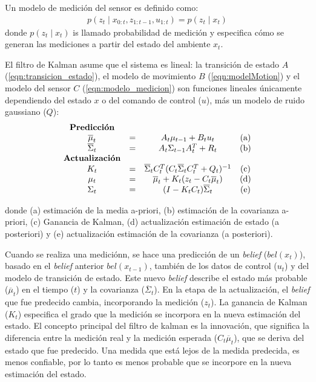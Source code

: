 Un modelo de medici\'on del sensor es definido como:
\begin{align}
\label{eqn:modelo_medicion}
p(z_{t}\mid x_{0:t}, z_{1:t-1}, u_{1:t}) = p (z_{t}\mid x_{t})
\end{align}
donde $p(z_{t}\mid x_{t})$ is llamado probabilidad de medición y especifica cómo se generan 
las mediciones a partir del estado del ambiente $x_{t}$.

El filtro de Kalman asume que el sistema es lineal: la transición de estado 
$A$ (\ref{eqn:transicion_estado}), el modelo de movimiento $B$ (\ref{eqn:modelMotion})  
y el modelo del sensor $C$ (\ref{eqn:modelo_medicion}) son funciones lineales únicamente 
dependiendo del estado $x$ o del comando de control ($u$), más un modelo 
de ruido gaussiano ($Q$):
\begin{equation*}
\label{eqn: Kalman Filter}
\begin{matrix}
\textrm{\textbf{Predicción}}\\
\overline{\mu}_{t} &= &A_{t}\mu_{t-1} + B_{t} u_{t} &\textrm{(a)}\\
\overline{\Sigma}_{t} &= &A_{t}\Sigma_{t-1} A_{t}^{T} + R_{t} &\textrm{(b)}\\
\textrm{\textbf{Actualización}}\\
K_{t} &= &\overline{\Sigma}_{t}C_{t}^{T}(C_{t}\overline{\Sigma}_{t}C_{t}^{T} + Q_{t})^{-1} &\textrm{(c)}\\
\mu_{t} &= &\overline{\mu}_{t} + K_{t}(z_{t} - C_{t}\overline{\mu}_{t}) &\textrm{(d)}\\
\Sigma_{t} &= &(I - K_{t}C_{t})\overline{\Sigma}_{t} &\textrm{(e)}\\
\end{matrix}
\end{equation*}

donde (a) estimación de la media a-priori, (b) estimación de la covarianza a-priori, 
(c) Ganancia de Kalman, (d) actualización estimación de estado (a posteriori) y (e) actualización 
estimación de la covarianza (a posteriori).

Cuando se realiza una medici\'onn, se hace una predicci\'on de un \textit{belief} 
($bel(x_{t})$),\\ basado en el \textit{belief} anterior $bel(x_{t-1})$, tambi\'en de los 
datos de control ($u_{t}$) y del modelo de transición de estado. Este nuevo \textit{belief}
describe el estado más probable ($\overline{\mu}_{t}$) en el tiempo ($t$) y la covarianza 
($\overline{\Sigma}_{t}$). En la etapa de la actualización, el \textit{belief} que fue predecido 
cambia, incorporando la medici\'on ($z_{t}$). La ganancia de Kalman ($K_{t}$) especifica el
grado que la medici\'on se incorpora en la nueva estimación del estado. El concepto principal 
del filtro de kalman es la innovaci\'on, que significa la diferencia entre la medici\'on 
real y la medici\'on esperada ($C_{t}\overline{\mu}_{t}$), que se deriva del estado que fue 
predecido. Una medida que está lejos de la medida predecida, es menos confiable, por lo tanto 
es menos probable que se incorpore en la nueva estimación del estado.

